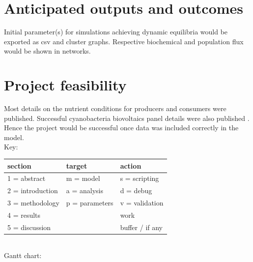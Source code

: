 \documentclass[a4paper, 11pt]{article}
\begin{document}
\section{Anticipated outputs and outcomes}
Initial parameter(s) for simulations achieving dynamic equilibria would be exported as csv and cluster graphs.  Respective biochemical and population flux would be shown in networks.

\section{Project feasibility}
Most details on the nutrient conditions for producers \autocite{duarte2009microbial,markou2014microalgal} and consumers \autocite{neff1957purification,mooshammer2014stoichiometric} were published.  Successful cyanobacteria biovoltaics panel details were also published \autocite{mccormick2015biophotovoltaics}.  Hence the project would be successful once data was included correctly in the model.\\
Key:
\begin{tabular}{lll}
	section & target & action\\\hline
	1 = abstract & m = model & s = scripting\\
	2 = introduction & a = analysis & d = debug\\
	3 = methodology & p = parameters & v = validation\\
	4 = results && \cellcolor{grey90}work\\
	5 = discussion && \cellcolor{lorange}buffer / if any\\
\end{tabular}\\
Gantt chart:
\end{document}
